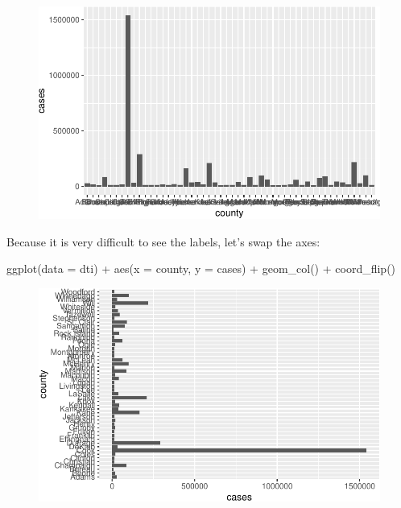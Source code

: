 \documentclass[
  letterpaper,
  DIV=11,
  numbers=noendperiod]{scrreprt}
\newenvironment{Shaded}{\begin{snugshade}}{\end{snugshade}}
\newcommand{\AttributeTok}[1]{\textcolor[rgb]{0.40,0.45,0.13}{#1}}
\newcommand{\FunctionTok}[1]{\textcolor[rgb]{0.28,0.35,0.67}{#1}}
\newcommand{\NormalTok}[1]{\textcolor[rgb]{0.00,0.23,0.31}{#1}}
\newcommand{\SpecialCharTok}[1]{\textcolor[rgb]{0.37,0.37,0.37}{#1}}
\begin{document}
\begin{figure}[H]

{\centering \includegraphics{./01-dataviz_files/figure-pdf/unnamed-chunk-6-1.pdf}

}

\end{figure}

Because it is very difficult to see the labels, let's swap the axes:

\begin{Shaded}
\begin{Highlighting}[]
\FunctionTok{ggplot}\NormalTok{(}\AttributeTok{data =}\NormalTok{ dti) }\SpecialCharTok{+} 
  \FunctionTok{aes}\NormalTok{(}\AttributeTok{x =}\NormalTok{ county, }\AttributeTok{y =}\NormalTok{ cases) }\SpecialCharTok{+} 
  \FunctionTok{geom\_col}\NormalTok{() }\SpecialCharTok{+} 
  \FunctionTok{coord\_flip}\NormalTok{()}
\end{Highlighting}
\end{Shaded}

\begin{figure}[H]

{\centering \includegraphics{./01-dataviz_files/figure-pdf/unnamed-chunk-7-1.pdf}

}

\end{figure}
\end{document}
